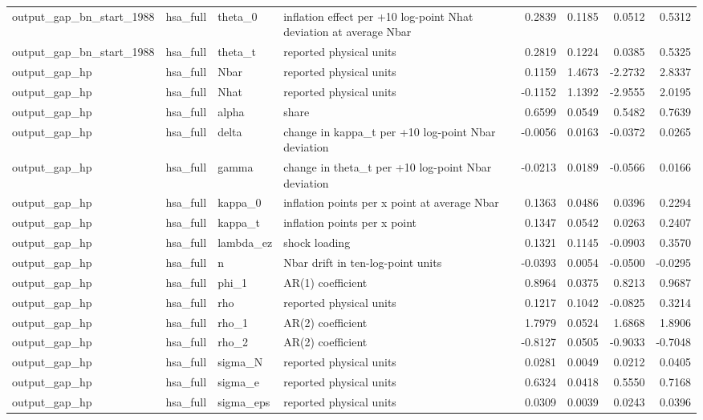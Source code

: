 \begin{tabular}{llllrrrr}
output\_gap\_bn\_start\_1988 & hsa\_full & theta\_0 & inflation effect per +10 log-point Nhat deviation at average Nbar & 0.2839 & 0.1185 & 0.0512 & 0.5312 \\
output\_gap\_bn\_start\_1988 & hsa\_full & theta\_t & reported physical units & 0.2819 & 0.1224 & 0.0385 & 0.5325 \\
output\_gap\_hp & hsa\_full & Nbar & reported physical units & 0.1159 & 1.4673 & -2.2732 & 2.8337 \\
output\_gap\_hp & hsa\_full & Nhat & reported physical units & -0.1152 & 1.1392 & -2.9555 & 2.0195 \\
output\_gap\_hp & hsa\_full & alpha & share & 0.6599 & 0.0549 & 0.5482 & 0.7639 \\
output\_gap\_hp & hsa\_full & delta & change in kappa\_t per +10 log-point Nbar deviation & -0.0056 & 0.0163 & -0.0372 & 0.0265 \\
output\_gap\_hp & hsa\_full & gamma & change in theta\_t per +10 log-point Nbar deviation & -0.0213 & 0.0189 & -0.0566 & 0.0166 \\
output\_gap\_hp & hsa\_full & kappa\_0 & inflation points per x point at average Nbar & 0.1363 & 0.0486 & 0.0396 & 0.2294 \\
output\_gap\_hp & hsa\_full & kappa\_t & inflation points per x point & 0.1347 & 0.0542 & 0.0263 & 0.2407 \\
output\_gap\_hp & hsa\_full & lambda\_ez & shock loading & 0.1321 & 0.1145 & -0.0903 & 0.3570 \\
output\_gap\_hp & hsa\_full & n & Nbar drift in ten-log-point units & -0.0393 & 0.0054 & -0.0500 & -0.0295 \\
output\_gap\_hp & hsa\_full & phi\_1 & AR(1) coefficient & 0.8964 & 0.0375 & 0.8213 & 0.9687 \\
output\_gap\_hp & hsa\_full & rho & reported physical units & 0.1217 & 0.1042 & -0.0825 & 0.3214 \\
output\_gap\_hp & hsa\_full & rho\_1 & AR(2) coefficient & 1.7979 & 0.0524 & 1.6868 & 1.8906 \\
output\_gap\_hp & hsa\_full & rho\_2 & AR(2) coefficient & -0.8127 & 0.0505 & -0.9033 & -0.7048 \\
output\_gap\_hp & hsa\_full & sigma\_N & reported physical units & 0.0281 & 0.0049 & 0.0212 & 0.0405 \\
output\_gap\_hp & hsa\_full & sigma\_e & reported physical units & 0.6324 & 0.0418 & 0.5550 & 0.7168 \\
output\_gap\_hp & hsa\_full & sigma\_eps & reported physical units & 0.0309 & 0.0039 & 0.0243 & 0.0396 \\

\end{tabular}
